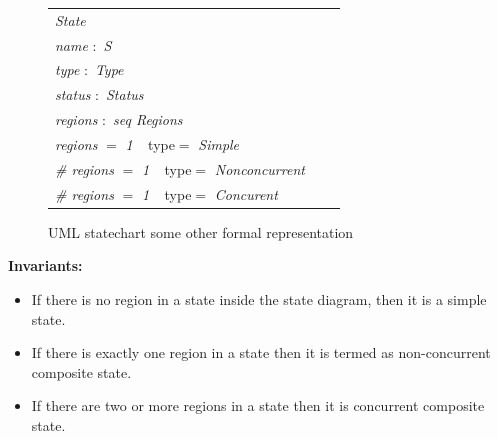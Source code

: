 \begin{figure}[ht!]
	\centering
	\begin{tabular}{lll}
		\footnotesize                       
		\textit{State}       \\
		
		\footnotesize
		\textit{name}   $:$    \textit{S}  \\   
		\footnotesize
		\textit{type}   $:$    \textit{Type}  \\   
		\footnotesize
		\textit{status}   $:$    \textit{Status}      \\
		\footnotesize
		\textit{regions} $:$   \textit{seq Regions} \\
		
		\footnotesize
		\textit{regions} $=$   \textit{1} $\ \  $ {type}$=$   \textit{Simple} \\
		\footnotesize
		 \textit{\# regions} $=$   \textit{1} $\ \  $ {type}$=$   \textit{Nonconcurrent} \\
		 \textit{\# regions} $=$   \textit{1} $\ \  $ {type}$=$   \textit{Concurent} \\
		 
		
	\end{tabular}
	\caption{UML statechart some other formal representation}
	\label{statechart_formal_representation_part2}
\end{figure}

\textbf{Invariants:}
\begin{itemize}
\item  If there is no region in a state inside the state diagram, then it is a simple state.
\item  If there is exactly one region in a state then it is termed as non-concurrent composite state.
\item  If there are two or more regions in a state then it is
concurrent composite state.
\end{itemize}


